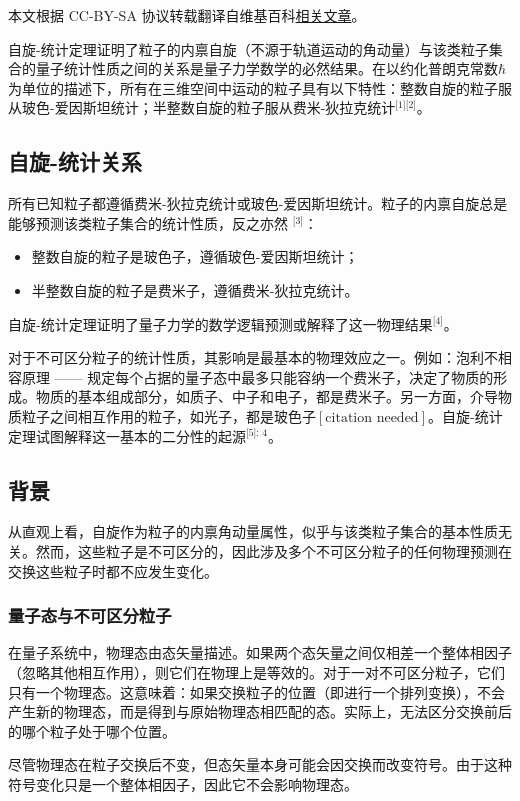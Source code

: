
本文根据 CC-BY-SA 协议转载翻译自维基百科\href{https://en.wikipedia.org/wiki/Spin\%E2\%80\%93statistics_theorem}{相关文章}。

自旋-统计定理证明了粒子的内禀自旋（不源于轨道运动的角动量）与该类粒子集合的量子统计性质之间的关系是量子力学数学的必然结果。在以约化普朗克常数\( \hbar \)为单位的描述下，所有在三维空间中运动的粒子具有以下特性：整数自旋的粒子服从玻色-爱因斯坦统计；半整数自旋的粒子服从费米-狄拉克统计\(^\text{[1][2]}\)。
\subsection{自旋-统计关系} 
所有已知粒子都遵循费米-狄拉克统计或玻色-爱因斯坦统计。粒子的内禀自旋总是能够预测该类粒子集合的统计性质，反之亦然 \(^\text{[3]}\)：  
\begin{itemize}
\item 整数自旋的粒子是玻色子，遵循玻色-爱因斯坦统计；  
\item 半整数自旋的粒子是费米子，遵循费米-狄拉克统计。  
\end{itemize}
自旋-统计定理证明了量子力学的数学逻辑预测或解释了这一物理结果\(^\text{[4]}\)。  

对于不可区分粒子的统计性质，其影响是最基本的物理效应之一。例如：泡利不相容原理 —— 规定每个占据的量子态中最多只能容纳一个费米子，决定了物质的形成。物质的基本组成部分，如质子、中子和电子，都是费米子。另一方面，介导物质粒子之间相互作用的粒子，如光子，都是玻色子\([\text{citation needed}]\)。自旋-统计定理试图解释这一基本的二分性的起源\(^\text{[5]: 4}\)。
\subsection{背景}
从直观上看，自旋作为粒子的内禀角动量属性，似乎与该类粒子集合的基本性质无关。然而，这些粒子是不可区分的，因此涉及多个不可区分粒子的任何物理预测在交换这些粒子时都不应发生变化。
\subsubsection{量子态与不可区分粒子}
在量子系统中，物理态由态矢量描述。如果两个态矢量之间仅相差一个整体相因子（忽略其他相互作用），则它们在物理上是等效的。对于一对不可区分粒子，它们只有一个物理态。这意味着：如果交换粒子的位置（即进行一个排列变换），不会产生新的物理态，而是得到与原始物理态相匹配的态。实际上，无法区分交换前后的哪个粒子处于哪个位置。  

尽管物理态在粒子交换后不变，但态矢量本身可能会因交换而改变符号。由于这种符号变化只是一个整体相因子，因此它不会影响物理态。  

